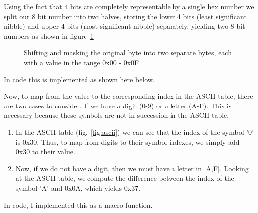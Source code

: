 \documentclass[11pt,a4paper,titlepage]{article}
\begin{document}
	Using the fact that 4 bits are completely representable by a single hex number we split our 8 bit number into two halves, storing the lower 4 bits (least significant nibble) and upper 4 bits (most significant nibble) separately, yielding two 8 bit numbers as shown in figure~\ref{fig:nibbleshift}
	\begin{figure}[h]
		\centering
		\caption{Shifting and masking the original byte into two separate bytes, each with a value in the range 0x00 - 0x0F}
		\label{fig:nibbleshift}
	\end{figure}
	
	\pagebreak
	\noindent In code this is implemented as shown here below.
	
	\vspace{5mm}
	\vspace{5mm}
	
	\noindent Now, to map from the value to the corresponding index in the ASCII table, there are two cases to consider. If we have a digit (0-9) or a letter (A-F). This is necessary because these symbols are not in succession in the ASCII table.
	\begin{enumerate}
		\item[Case 1] In the ASCII table (fig.~\ref{fig:ascii}) we can see that the index of the symbol '0' is 0x30. Thus, to map from digits to their symbol indexes, we simply add 0x30 to their value.
		\item[Case 2] Now, if we do not have a digit, then we must have a letter in [A,F]. Looking at the ASCII table, we compute the difference between the index of the symbol 'A' and 0x0A, which yields 0x37.
	\end{enumerate}
	
	\noindent In code, I implemented this as a macro function.
	
	\vspace{5mm}
	
	
\end{document}
